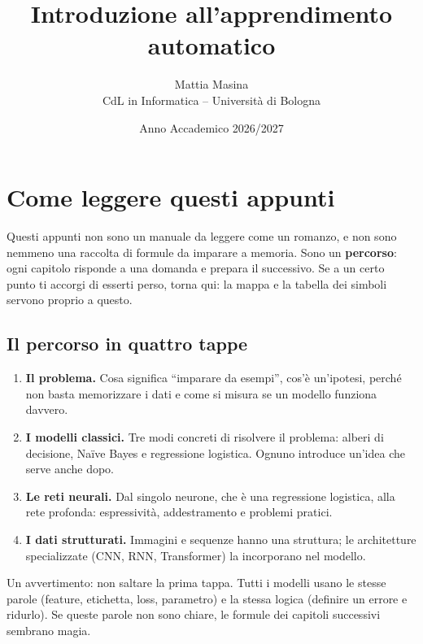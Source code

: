 \documentclass[12pt]{extarticle}
\title{Introduzione all'apprendimento automatico}
\author{Mattia Masina\\CdL in Informatica -- Università di Bologna}
\date{Anno Accademico 2026/2027}
\begin{document}
\maketitle
\newpage

\tableofcontents
\newpage

\section*{Come leggere questi appunti}

\noindent
Questi appunti non sono un manuale da leggere come un romanzo, e non sono nemmeno una raccolta di formule da imparare a memoria. Sono un \textbf{percorso}: ogni capitolo risponde a una domanda e prepara il successivo. Se a un certo punto ti accorgi di esserti perso, torna qui: la mappa e la tabella dei simboli servono proprio a questo.

\subsection*{Il percorso in quattro tappe}

\begin{enumerate}[1.]
    \item \textbf{Il problema.} Cosa significa ``imparare da esempi'', cos'è un'ipotesi, perché non basta memorizzare i dati e come si misura se un modello funziona davvero.
    \item \textbf{I modelli classici.} Tre modi concreti di risolvere il problema: alberi di decisione, Naïve Bayes e regressione logistica. Ognuno introduce un'idea che serve anche dopo.
    \item \textbf{Le reti neurali.} Dal singolo neurone, che è una regressione logistica, alla rete profonda: espressività, addestramento e problemi pratici.
    \item \textbf{I dati strutturati.} Immagini e sequenze hanno una struttura; le architetture specializzate (CNN, RNN, Transformer) la incorporano nel modello.
\end{enumerate}

\noindent
Un avvertimento: non saltare la prima tappa. Tutti i modelli usano le stesse parole (feature, etichetta, loss, parametro) e la stessa logica (definire un errore e ridurlo). Se queste parole non sono chiare, le formule dei capitoli successivi sembrano magia.
\end{document}
